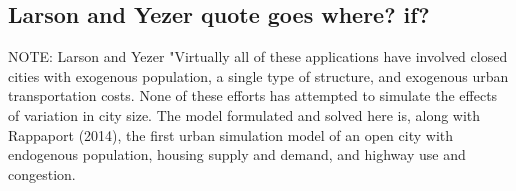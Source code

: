 


 




\subsection{Larson and Yezer quote goes where? if?}
NOTE: Larson and Yezer \cite{larsonEnergyImplicationsCity2015}  "Virtually all of these applications have involved closed cities with exogenous population, a single type of structure, and exogenous urban transportation costs. None of these efforts has attempted to simulate the effects of variation in city size. The model formulated and solved here is, along with Rappaport (2014), the first urban simulation model of an open city with endogenous population, housing supply and demand, and highway use and congestion. 